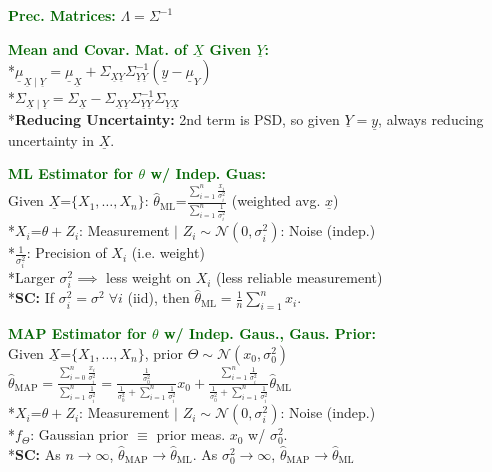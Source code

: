 \documentclass[5pt]{extarticle} %
\begin{document}
\begin{paracol}{3}
{    \textcolor{darkgreen}{\textbf{Prec. Matrices:}} $\Lambda = \Sigma^{-1}$ 

    \textcolor{darkgreen}{\textbf{Mean and Covar. Mat. of $\underline{X}$ Given $\underline{Y}$:}} \\
    *$\underline{\mu}_{\underline{X} \mid \underline{Y}} = \underline{\mu}_{\underline{X}} + \Sigma_{\underline{X} \underline{Y}} \Sigma_{\underline{Y} \underline{Y}}^{-1} (\underline{y} - \underline{\mu}_Y)$ \\
    *$\Sigma_{\underline{X} \mid \underline{Y}} = \Sigma_{\underline{X}} - \Sigma_{\underline{X} \underline{Y}} \Sigma_{\underline{Y} \underline{Y}}^{-1} \Sigma_{\underline{Y} \underline{X}}$ \\ 
    *\textbf{Reducing Uncertainty:} 2nd term is PSD, so given $\underline{Y} = \underline{y}$, always reducing uncertainty in $\underline{X}$.
    
    \textcolor{darkgreen}{\textbf{ML Estimator for $\theta$ w/ Indep. Guas:}}  \\
    Given $\underline{X} \text{=} \{X_1,\ldots,X_n\}$: $\hat{\theta}_{\text{ML}} \text{=} \frac{\sum_{i=1}^n \frac{x_i}{\sigma_i^2}}{\sum_{i=1}^n \frac{1}{\sigma_i^2}}$ (weighted avg. $\underline{x}$) \\
    *$X_i \text{=} \theta + Z_i$: Measurement $\mid$ $Z_i \sim \mathcal{N}(0, \sigma_i^2)$: Noise (indep.) \\
    *$\frac{1}{\sigma_i^2}$: Precision of $X_i$ (i.e. weight) \\
    *Larger $\sigma_i^2 \implies$ less weight on $X_i$ (less reliable measurement) \\
    *\textbf{SC:} If $\sigma_i^2 = \sigma^2 \; \forall i$ (iid), then $\hat{\theta}_{\text{ML}} = \frac{1}{n} \sum_{i=1}^n x_i$.

    \textcolor{darkgreen}{\textbf{MAP Estimator for $\theta$ w/ Indep. Gaus., Gaus. Prior:}} \\
    Given $\underline{X} \text{=} \{X_1,\ldots,X_n\}$, prior $\Theta \sim \mathcal{N} (x_0, \sigma_0^2)$ \\
    $\hat{\theta}_{\text{MAP}} = \frac{\sum_{i=0}^n \frac{x_i}{\sigma_i^2}}{\sum_{i=1}^n \frac{1}{\sigma_i^2}} = \frac{\frac{1}{\sigma_0^2}}{\frac{1}{\sigma_0^2} + \sum_{i=1}^n \frac{1}{\sigma_i^2}} x_0 + \frac{\sum_{i=1}^n \frac{1}{\sigma_i^2}}{\frac{1}{\sigma_0^2} + \sum_{i=1}^n \frac{1}{\sigma_i^2}} \hat{\theta}_{\text{ML}}$ \\
    *$X_i \text{=} \theta + Z_i$: Measurement $\mid$ $Z_i \sim \mathcal{N}(0, \sigma_i^2)$: Noise (indep.) \\
    *$f_\Theta$: Gaussian prior $\equiv$ prior meas. $x_0$ w/ $\sigma_0^2$. \\
    *\textbf{SC:} As $n \rightarrow \infty$, $\hat{\theta}_{\text{MAP}} \rightarrow \hat{\theta}_{\text{ML}}$. As $\sigma_0^2 \rightarrow \infty$, $\hat{\theta}_{\text{MAP}} \rightarrow \hat{\theta}_{\text{ML}}$ 

}
\end{paracol}
\end{document}
